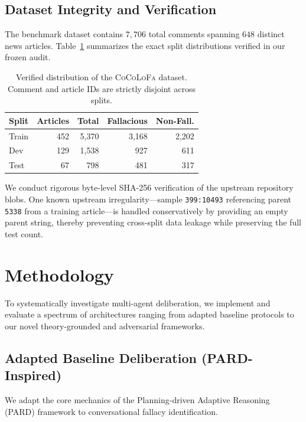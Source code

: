 \documentclass[11pt]{article}
\begin{document}
\subsection{Dataset Integrity and Verification}
The benchmark dataset contains $7{,}706$ total comments spanning $648$ distinct news articles. Table~\ref{tab:dataset_splits} summarizes the exact split distributions verified in our frozen audit.

\begin{table}[h]
\centering
\small
\begin{tabular}{lrrrr}
\toprule
\textbf{Split} & \textbf{Articles} & \textbf{Total} & \textbf{Fallacious} & \textbf{Non-Fall.} \\
\midrule
Train & 452 & 5,370 & 3,168 & 2,202 \\
Dev   & 129 & 1,538 & 927   & 611   \\
Test  & 67  & 798   & 481   & 317   \\
\bottomrule
\end{tabular}
\caption{Verified distribution of the \textsc{CoCoLoFa} dataset. Comment and article IDs are strictly disjoint across splits.}
\label{tab:dataset_splits}
\end{table}

We conduct rigorous byte-level SHA-256 verification of the upstream repository blobs. One known upstream irregularity—sample \texttt{399:10493} referencing parent \texttt{5338} from a training article—is handled conservatively by providing an empty parent string, thereby preventing cross-split data leakage while preserving the full test count.

\section{Methodology}

To systematically investigate multi-agent deliberation, we implement and evaluate a spectrum of architectures ranging from adapted baseline protocols to our novel theory-grounded and adversarial frameworks.

\subsection{Adapted Baseline Deliberation (PARD-Inspired)}
We adapt the core mechanics of the Planning-driven Adaptive Reasoning (PARD) framework \cite{pard2026} to conversational fallacy identification.
\end{document}
